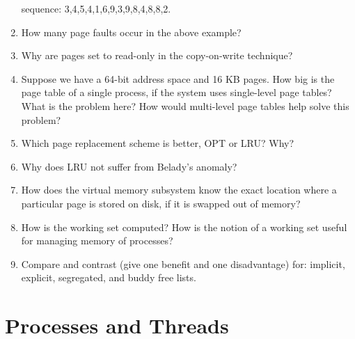 \documentclass[11pt]{article}
\begin{document}
\begin{enumerate}
       sequence: 3,4,5,4,1,6,9,3,9,8,4,8,8,2.
\item How many page faults occur in the above example?
\item Why are pages set to read-only in the copy-on-write technique?
\item Suppose we have a 64-bit address space and 16 KB pages. How big
       is the page table of a single process, if the system uses
       single-level page tables? What is the problem here? How would multi-level page tables help solve this problem?
\item Which page replacement scheme is better, OPT or LRU? Why?
\item Why does LRU not suffer from Belady’s anomaly?
\item How does the virtual memory subsystem know the exact location
       where a particular page is stored on disk, if it is swapped out of memory?
\item How is the working set computed? How is the notion of a working
       set useful for managing memory of processes?
\item Compare and contrast (give one benefit and one disadvantage)
       for: implicit, explicit, segregated, and buddy free lists.
\end{enumerate}
\section{Processes and Threads}
\label{sec-10}
\end{document}

